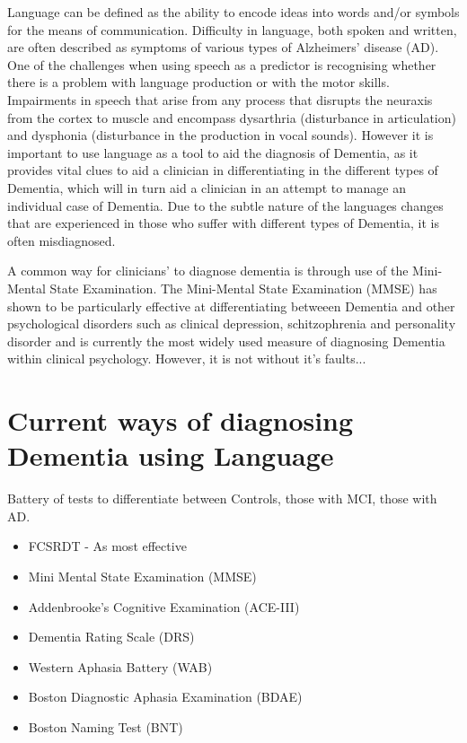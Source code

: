 \documentclass[a4paper]{article}
\begin{document}
Language can be defined as the ability to encode ideas into words and/or symbols for the means of communication. Difficulty in language, both spoken and written, are often described as symptoms of various types of Alzheimers' disease (AD). One of the challenges when using speech as a predictor is recognising whether there is a problem with language production or with the motor skills. Impairments in speech that arise from any process that disrupts the neuraxis from the cortex to muscle and encompass dysarthria (disturbance in articulation) and dysphonia (disturbance in the production in vocal sounds). However it is important to use language as a tool to aid the diagnosis of Dementia, as it provides vital clues to aid a clinician in differentiating in the different types of Dementia, which will in turn aid a clinician in an attempt to manage an individual case of Dementia. Due to the subtle nature of the languages changes that are experienced in those who suffer with different types of Dementia, it is often misdiagnosed.



A common way for clinicians' to diagnose dementia is through use of the Mini-Mental State Examination. The Mini-Mental State Examination (MMSE) has shown to be particularly effective at differentiating betweeen Dementia and other psychological disorders such as clinical depression, schitzophrenia and personality disorder and is currently the most widely used measure of diagnosing Dementia within clinical psychology.  However, it is not without it's faults...

\section{Current ways of diagnosing Dementia using Language}
Battery of tests to differentiate between Controls, those with MCI, those with AD. 
\begin{itemize}
	\item FCSRDT - As most effective 
	\item Mini Mental State Examination (MMSE)
	\item Addenbrooke's Cognitive Examination (ACE-III)
	\item Dementia Rating Scale (DRS)
	\item Western Aphasia Battery (WAB)
	\item Boston Diagnostic Aphasia Examination (BDAE)
	\item Boston Naming Test (BNT)
\end{itemize}
\end{document}
